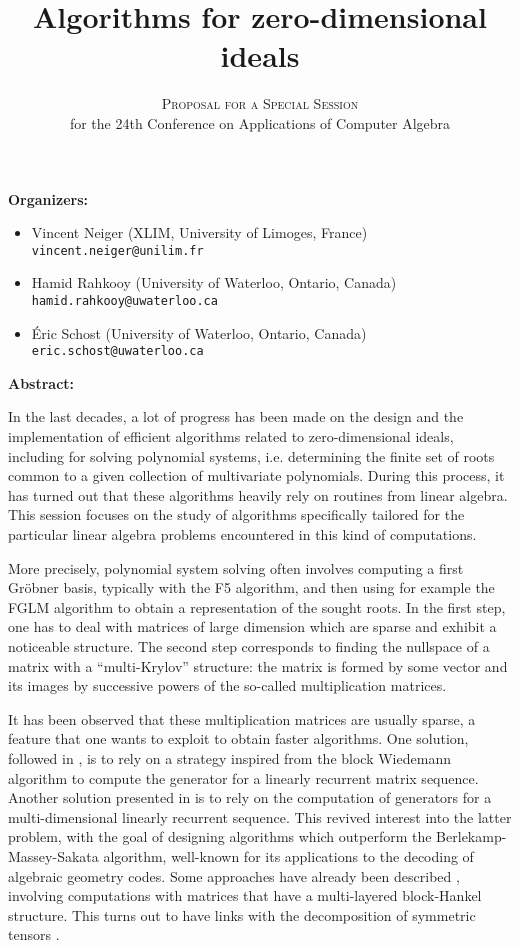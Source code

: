 \documentclass[12pt,english]{article}
\title{Algorithms for zero-dimensional ideals}
\author{\textsc{Proposal for a Special Session} \\
  for the 24th Conference on Applications of Computer Algebra}
\date{}
\begin{document}
\maketitle

\textbf{Organizers:}
\begin{itemize}
  \item Vincent Neiger (XLIM, University of Limoges, France) \\
    {\small \verb+vincent.neiger@unilim.fr+}
  \item Hamid Rahkooy (University of Waterloo, Ontario, Canada) \\
    {\small \verb+hamid.rahkooy@uwaterloo.ca+}
  \item \'Eric Schost (University of Waterloo, Ontario, Canada) \\
    {\small \texttt{eric.schost@uwaterloo.ca}}
\end{itemize}

\textbf{Abstract:}

In the last decades, a lot of progress has been made on the design and the
implementation of efficient algorithms related to zero-dimensional ideals,
including for solving polynomial systems, i.e. determining the finite set of
roots common to a given collection of multivariate polynomials.  During this
process, it has turned out that these algorithms heavily rely on routines from
linear algebra.  This session focuses on the study of algorithms specifically
tailored for the particular linear algebra problems encountered in this kind of
computations.

More precisely, polynomial system solving often involves computing a first
Gr\"obner basis, typically with the F5 algorithm, and then using for example
the FGLM algorithm \cite{FaGiLaMo93} to obtain a representation of the sought
roots.  In the first step, one has to deal with matrices of large dimension
which are sparse and exhibit a noticeable structure.  The second step
corresponds to finding the nullspace of a matrix with a ``multi-Krylov''
structure: the matrix is formed by some vector and its images by successive
powers of the so-called multiplication matrices.

It has been observed that these multiplication matrices are usually sparse, a
feature that one wants to exploit to obtain faster algorithms.  One solution,
followed in \cite{Steel15}, is to rely on a strategy inspired from the block
Wiedemann algorithm \cite{Coppersmith94,Villard97a} to compute the generator
for a linearly recurrent matrix sequence.  Another solution presented in
\cite{FaMo17} is to rely on the computation of generators for a
multi-dimensional linearly recurrent sequence.  This revived interest into the
latter problem, with the goal of designing algorithms which outperform the
Berlekamp-Massey-Sakata algorithm, well-known for its applications to the
decoding of algebraic geometry codes.  Some approaches have already been
described \cite{BerBoyFau17,Mourrain17}, involving computations with matrices
that have a multi-layered block-Hankel structure.  This turns out to have links
with the decomposition of symmetric tensors \cite{BrCoMots10}.
\end{document}
